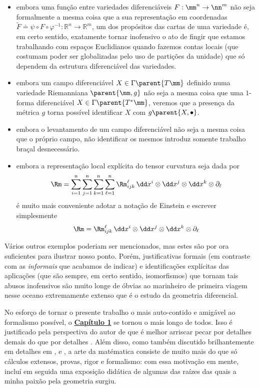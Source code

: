 \begin{itemize}
\item embora uma função entre variedades diferenciáveis $F: \mm^n \to \nn^m$ não seja formalmente a mesma coisa que a sua representação em coordenadas $\widetilde{F} \doteq \psi \circ F \circ \varphi^{-1} :  \mathbb{R}^n \to \mathbb{R}^m$, um dos propósitos das cartas de uma variedade é, em certo sentido, exatamente tornar inofensivo o ato de fingir que estamos trabalhando com espaços Euclidianos quando fazemos contas locais (que costumam poder ser globalizadas pelo uso de partições da unidade) que só dependem da estrutura diferenciável das variedades.
\item embora um campo diferenciável $X \in \Gamma\parent{T \mm}$ definido numa variedade Riemanniana $\parent{\mm, g}$ não seja a mesma coisa que uma $1$-forma diferenciável $X \in \Gamma\parent{T^{*} \mm}$, veremos que a presença da métrica $g$ torna possível identificar $X$ com $g\parent{X, \bullet}$.
\item embora o levantamento de um campo diferenciável não seja a mesma coisa que o próprio campo, não identificar os mesmos introduz somente trabalho braçal desnecessário. 
\item embora a representação local explícita do tensor curvatura seja dada por
\[
\Rm=\sum_{i=1}^{n} \sum_{j=1}^{n} \sum_{k=1}^{n} \sum_{\ell=1}^{n} \Rm_{i j k}^{\ell} \, \dd x^i \otimes \dd x^j \otimes \dd x^{k} \otimes \partial_{\ell} 
\]
é muito mais conveniente adotar a notação de Einstein e escrever simplesmente
\[ 
\Rm = \Rm_{i j k}^{\ell} \,  \dd x^i \otimes \dd x^j \otimes \dd x^{k} \otimes \partial_{\ell} 
\]
\end{itemize}
Vários outros exemplos poderiam ser mencionados, mas estes são por ora suficientes para ilustrar nosso ponto. Porém, justificativas formais (em contraste com as \emph{informais} que acabamos de indicar) e identificações explícitas das aplicações (que são sempre, em certo sentido, isomorfismos) que tornam tais abusos inofensivos são muito longe de óbvias ao marinheiro de primeira viagem nesse oceano extremamente extenso que é o estudo da geometria diferencial.  \par 
No esforço de tornar o presente trabalho o mais auto-contido e amigável ao formalismo possível, o \hyperref[cap:preliminares]{\textcolor{gal}{\textbf{Capítulo 1}}} se tornou o mais longo de todos. Isso é justificado pela perspectiva do autor de que é melhor arriscar pecar por detalhes demais do que por detalhes . Além disso, como também discutido brilhantemente em detalhes em ,  e , a arte da matématica consiste de muito mais do que só cálculos extensos, provas, rigor e formalismo: com essa motivação em mente, incluí em seguida uma exposição didática de algumas das raízes das quais a minha paixão pela geometria surgiu.
